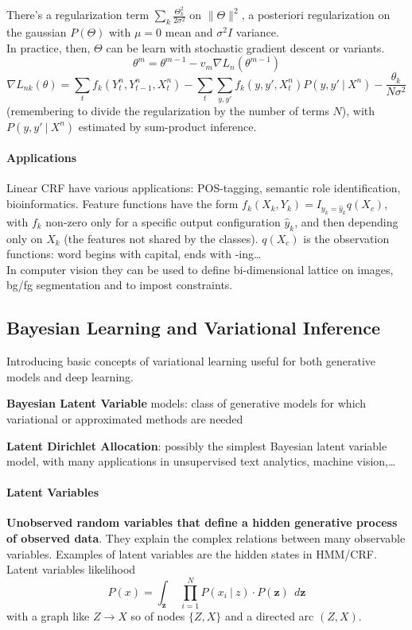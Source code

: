 \documentclass[10pt]{report}
\begin{document}
There's a regularization term $\sum_k\frac{\Theta_k^2}{2\sigma^2}$ on $\|\Theta\|^2$, a posteriori regularization on the gaussian $P(\Theta)$ with $\mu=0$ mean and $\sigma^2I$ variance.\\
In practice, then, $\Theta$ can be learn with stochastic gradient descent or variants.
$$\theta^m = \theta^{m-1} - v_m\nabla L_n(\theta^{m-1})$$
$$\nabla L_{nk}(\theta) = \sum_t f_k(Y_t^n,Y_{t-1}^n,X_t^n)-\sum_t\sum_{y,y'}f_k(y,y',X_t^n)P(y,y'\:|\:X^n)-\frac{\theta_k}{N\sigma^2}$$
(remembering to divide the regularization by the number of terms $N$), with$P(y,y'\:|\:X^n)$ estimated by sum-product inference.
\paragraph{Applications} Linear CRF have various applications: POS-tagging, semantic role identification, bioinformatics. Feature functions have the form $f_k(X_k,Y_k)=I_{y_k=\hat{y}_k}q(X_c)$, with $f_k$ non-zero only for a specific output configuration $\hat{y}_k$, and then depending only on $X_k$ (the features not shared by the classes). $q(X_c)$ is the observation functions: word begins with capital, ends with -ing\ldots\\
In computer vision they can be used to define bi-dimensional lattice on images, bg/fg segmentation and to impost constraints.
\subsection{Bayesian Learning and Variational Inference}
Introducing basic concepts of variational learning useful for both generative models and deep learning.
\begin{list}{}{}
	\item \textbf{Bayesian Latent Variable} models: class of generative models for which variational or approximated methods are needed
	\item \textbf{Latent Dirichlet Allocation}: possibly the simplest Bayesian latent variable model, with many applications in unsupervised text analytics, machine vision,\ldots
\end{list}
\paragraph{Latent Variables} \textbf{Unobserved random variables that define a hidden generative process of observed data}. They explain the complex relations between many observable variables. Examples of latent variables are the hidden states in HMM/CRF.\\
Latent variables likelihood $$P(x) = \int_\mathbf{z}\:\:\prod_{i=1}^N  P(x_i\:|\:z)\cdot P(\mathbf{z})\:\:d\mathbf{z}$$ with a graph like $Z \longrightarrow X$ so of nodes $\{Z,X\}$ and a directed arc $(Z,X)$.
\end{document}
